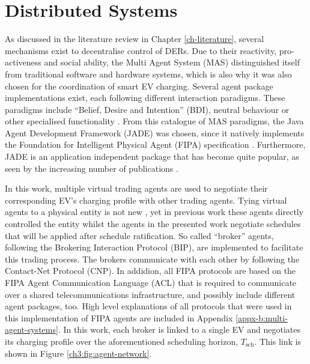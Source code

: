 \section{Distributed Systems}
\label{ch3:sec:distributed-systems}

As discussed in the literature review in Chapter \ref{ch-literature}, several mechanisms exist to decentralise control of DERs.
Due to their reactivity, pro-activeness and social ability, the Multi Agent System (MAS) distinguished itself from traditional software and hardware systems, which is also why it was also chosen for the coordination of smart EV charging.
Several agent package implementations exist, each following different interaction paradigms.
These paradigms include ``Belief, Desire and Intention'' (BDI), neutral behaviour or other specialised functionality \cite{Luck2004}.
From this catalogue of MAS paradigms, the Java Agent Development Framework (JADE) was chosen, since it natively implements the Foundation for Intelligent Physical Agent (FIPA) specification \cite{JADE-website, FIPA-agent-specs}.
Furthermore, JADE is an application independent package that has become quite popular, as seen by the increasing number of publications \cite{Karfopoulos2013, Eddy2011, Kuo2013, Mocci2014, Li2017}.

In this work, multiple virtual trading agents are used to negotiate their corresponding EV's charging profile with other trading agents.
Tying virtual agents to a physical entity is not new \cite{Dimeas2005, Nguyen2011, Nagata2011, Nagata2012}, yet in previous work these agents directly controlled the entity whilst the agents in the presented work negotiate schedules that will be applied after schedule ratification.
So called ``broker'' agents, following the Brokering Interaction Protocol (BIP), are implemented to facilitate this trading process.
The brokers communicate with each other by following the Contact-Net Protocol (CNP).
In addidion, all FIPA protocols are based on the FIPA Agent Communication Language (ACL) that is required to communicate over a shared telecommunications infrastructure, and possibly include different agent packages, too.
High level explanations of all protocols that were used in this implementation of FIPA agents are included in Appendix \ref{appx-b:multi-agent-systems}.
In this work, each broker is linked to a single EV and negotiates its charging profile over the aforementioned scheduling horizon, $T_\text{sch}$.
This link is shown in Figure \ref{ch3:fig:agent-network}.



